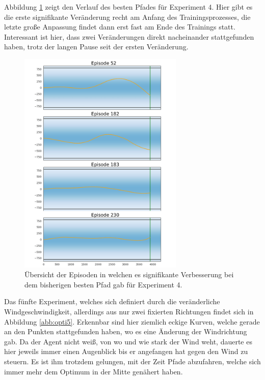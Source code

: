 \documentclass[]{iat}
\begin{document}
Abbildung \ref{abb:opti4} zeigt den Verlauf des besten Pfades für Experiment 4. Hier gibt es die erste signifikante Veränderung recht am Anfang des Trainingsprozesses, die letzte große Anpassung findet dann erst fast am Ende des Trainings statt. Interessant ist hier, dass zwei Veränderungen direkt nacheinander stattgefunden haben, trotz der langen Pause seit der ersten Veränderung.
\begin{figure}[H]
    \includegraphics[width=0.7\textwidth]{graphics/optimum_s4/optimum_s4.png}
    \centering
    \caption{Übersicht der Episoden in welchen es signifikante Verbesserung bei dem bisherigen besten Pfad gab für Experiment 4.}
    \label{abb:opti4}
\end{figure}
Das fünfte Experiment, welches sich definiert durch die veränderliche Windgeschwindigkeit, allerdings aus nur zwei fixierten Richtungen findet sich in Abbildung \ref{abb:opti5}. Erkennbar sind hier ziemlich eckige Kurven, welche gerade an den Punkten stattgefunden haben, wo es eine Änderung der Windrichtung gab. Da der Agent nicht weiß, von wo und wie stark der Wind weht, dauerte es hier jeweils immer einen Augenblick bis er angefangen hat gegen den Wind zu steuern. Es ist ihm trotzdem gelungen, mit der Zeit Pfade abzufahren, welche sich immer mehr dem Optimum in der Mitte genähert haben.
\end{document}

